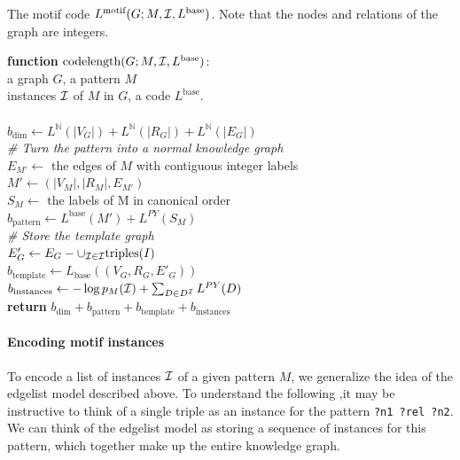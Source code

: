 \documentclass[letterpaper]{article} %
\newcommand{\N}{{\mathbb N}}
\newcommand{\I}{{\cal I}}
\newcommand{\tab}{\hspace*{5mm}}
\begin{document}
\begin{pseudo}[tb]
\caption{The motif code $L^\text{motif}(G ; M, {\cal I}, L^\text{base})$. Note that the nodes and relations of the graph are integers.}
\label{algorithm:motif-code}
{ 
\textbf{function} $\text{codelength}(G; M, {\cal I}, L^\text{base})$:\\
\tab\tab a graph $G$, a pattern $M$\\ 
\tab\tab instances $\cal I$ of $M$ in $G$, a code $L^\text{base}$.\\
\\
$b_\text{dim} \leftarrow L^\N(|V_G|) + L^\N(|R_G|) + L^\N(|E_G|)$ \\

\emph{\# Turn the pattern into a normal knowledge graph}\\
$E_{M'} \leftarrow$ the edges of $M$ with contiguous integer labels \\
$M' \leftarrow (|V_M|, |R_M|, E_{M'})$ \\
$S_M \leftarrow$ the labels of M in canonical order \\
$b_\text{pattern} \leftarrow L^\text{base}(M') + L^{PY}(S_M) $\\

\emph{\# Store the template graph}\\
$E'_G \leftarrow E_G - \cup_{\I \in {\cal I}} \text{triples}(I)$ \\
$b_\text{template} \leftarrow L_\text{base}((V_G, R_G, E'_G))$\\

$b_\text{instances} \leftarrow -\log p_M(\I) + \sum_{D \in D^{\I}} L^{PY}(D)$\\

\textbf{return} $b_\text{dim} + b_\text{pattern} + b_\text{template} + b_\text{instances}$\\
}
\end{pseudo} 

\paragraph{Encoding motif instances} To encode a list of instances $\I$ of a given pattern $M$, we generalize  the idea of the edgelist model described above. To understand the following ,it may be instructive to think of a single triple as an instance for the pattern \texttt{?n1 ?rel ?n2}. We can think of the edgelist model as storing a sequence of instances for this pattern, which together make up the entire knowledge graph.
 
\end{document}
